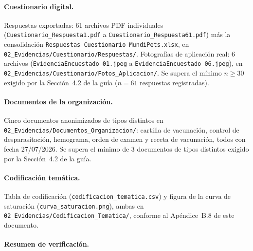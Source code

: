 \documentclass[journal,onecolumn]{IEEEtran}
\begin{document}
	\paragraph{Cuestionario digital.}
	Respuestas exportadas: 61 archivos PDF individuales
	(\texttt{Cuestionario\_Respuesta1.pdf} a
	\texttt{Cuestionario\_Respuesta61.pdf}) más la consolidación
	\texttt{Respuestas\_Cuestionario\_MundiPets.xlsx}, en
	\texttt{02\_Evidencias/Cuestionario/Respuestas/}. Fotografías de aplicación
	real: 6 archivos (\texttt{EvidenciaEncuestado\_01.jpeg} a
	\texttt{EvidenciaEncuestado\_06.jpeg}), en
	\texttt{02\_Evidencias/Cuestionario/Fotos\_Aplicacion/}. Se supera el
	mínimo $n \geq 30$ exigido por la Sección~4.2 de la guía ($n = 61$
	respuestas registradas).
	
	\paragraph{Documentos de la organización.}
	Cinco documentos anonimizados de tipos distintos en
	\texttt{02\_Evidencias/Documentos\_Organizacion/}: cartilla de vacunación,
	control de desparasitación, hemograma, orden de examen y receta de
	vacunación, todos con fecha 27/07/2026. Se supera el mínimo de 3
	documentos de tipos distintos exigido por la Sección~4.2 de la guía.
	
	\paragraph{Codificación temática.}
	Tabla de codificación (\texttt{codificacion\_tematica.csv}) y figura de la
	curva de saturación (\texttt{curva\_saturacion.png}), ambas en
	\texttt{02\_Evidencias/Codificacion\_Tematica/}, conforme al
	Apéndice~B.8 de este documento.
	
	\paragraph{Resumen de verificación.}
	
\end{document}
